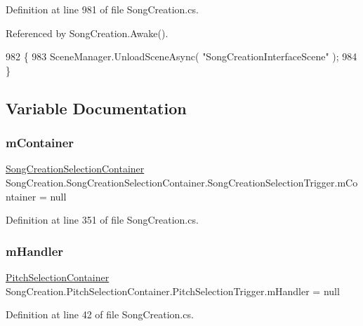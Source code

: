 Definition at line 981 of file Song\+Creation.\+cs.



Referenced by Song\+Creation.\+Awake().


\begin{DoxyCode}
982     \{
983         SceneManager.UnloadSceneAsync( \textcolor{stringliteral}{"SongCreationInterfaceScene"} );
984     \}
\end{DoxyCode}


\subsection{Variable Documentation}
\mbox{\label{group___s_c_handlers_ga23a094f17b949a4ea153f66c73e42578}} 
\subsubsection{\texorpdfstring{m\+Container}{mContainer}}
{\footnotesize\ttfamily \hyperlink{class_song_creation_1_1_song_creation_selection_container}{Song\+Creation\+Selection\+Container} Song\+Creation.\+Song\+Creation\+Selection\+Container.\+Song\+Creation\+Selection\+Trigger.\+m\+Container = null\hspace{0.3cm}{\ttfamily [private]}}



Definition at line 351 of file Song\+Creation.\+cs.

\mbox{\label{group___s_c_handlers_gaad92d071482ccc179c9a40cada09785b}} 
\subsubsection{\texorpdfstring{m\+Handler}{mHandler}}
{\footnotesize\ttfamily \hyperlink{class_song_creation_1_1_pitch_selection_container}{Pitch\+Selection\+Container} Song\+Creation.\+Pitch\+Selection\+Container.\+Pitch\+Selection\+Trigger.\+m\+Handler = null\hspace{0.3cm}{\ttfamily [private]}}



Definition at line 42 of file Song\+Creation.\+cs.

